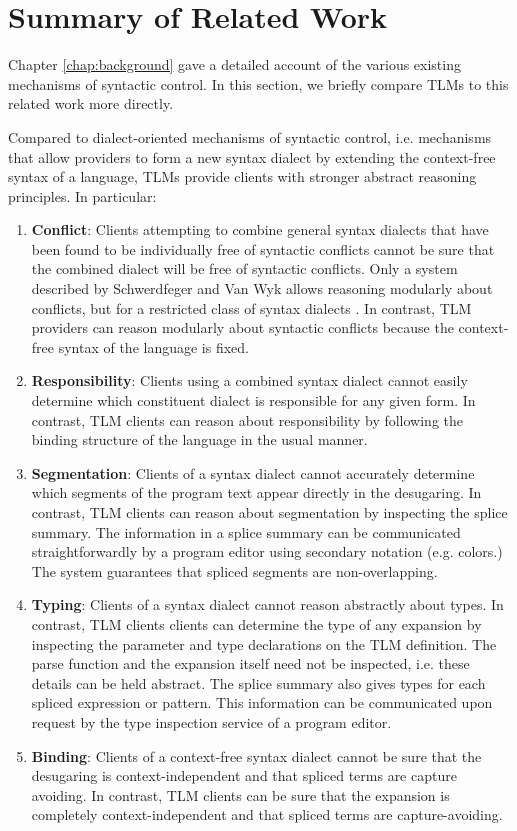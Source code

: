 \section{Summary of Related Work}
\vspace{-4px}
Chapter \ref{chap:background} gave a detailed account of the various existing mechanisms of syntactic control. In this section, we briefly compare TLMs to this related work more directly.

Compared to dialect-oriented mechanisms of syntactic control, i.e. mechanisms that allow  providers to form a new syntax dialect by extending the context-free syntax of a language, TLMs provide clients with stronger abstract reasoning principles. In particular:
\begin{enumerate}
\item \textbf{Conflict}: Clients attempting to combine general syntax dialects that have been found to be individually free of syntactic conflicts cannot  be sure that the combined dialect will be free of syntactic conflicts. Only a system described by Schwerdfeger and Van Wyk allows reasoning modularly about conflicts, but for a restricted class of syntax dialects \cite{conf/pldi/SchwerdfegerW09,schwerdfeger2010context}. In contrast, TLM providers can reason modularly about syntactic conflicts because the context-free syntax of the language is fixed.
\item \textbf{Responsibility}: Clients using a combined syntax dialect cannot easily determine which constituent dialect is responsible for any given form. In contrast, TLM clients can reason about responsibility by following the binding structure of the language in the usual manner.
\item \textbf{Segmentation}: Clients of a syntax dialect cannot accurately determine which segments of the program text appear directly in the desugaring. In contrast, TLM clients can reason about segmentation by inspecting the splice summary. The information in a splice summary can be communicated straightforwardly by a program editor using secondary notation (e.g. colors.) The system guarantees that spliced segments are non-overlapping.
\item \textbf{Typing}: Clients of a syntax dialect cannot reason abstractly about types. In contrast, TLM clients clients can determine the type of any expansion by inspecting the parameter and type declarations on the TLM definition. The parse function and the expansion itself need not be inspected, i.e. these details can be held abstract. The splice summary also gives types for each spliced expression or pattern. This information can be communicated upon request by the type inspection service of a program editor.
\item \textbf{Binding}: Clients of a context-free syntax dialect cannot be sure that the desugaring is context-independent and that spliced terms are capture avoiding. In contrast, TLM clients can be sure that the expansion is completely context-independent and that spliced terms are capture-avoiding.
\end{enumerate}

